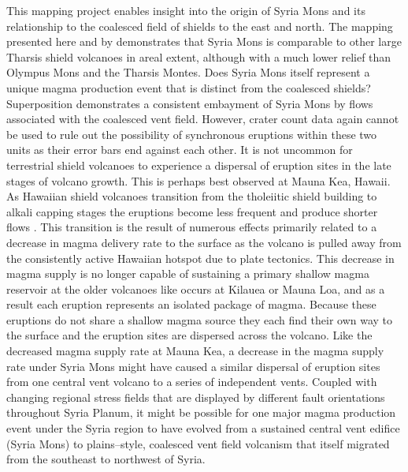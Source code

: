 \documentclass[preprint,review,authoryear,12pt]{elsarticle}
\begin{document}
This mapping project enables insight into the origin of Syria Mons and its relationship to the coalesced field of shields to the east and north.  The mapping presented here and by \citet{Baptista2008} demonstrates that Syria Mons is comparable to other large Tharsis shield volcanoes in areal extent, although with a much lower relief than Olympus Mons and the Tharsis Montes.  Does Syria Mons itself represent a unique magma production event that is distinct from the coalesced shields?  Superposition demonstrates a consistent embayment of Syria Mons by flows associated with the coalesced vent field.  However, crater count data again cannot be used to rule out the possibility of synchronous eruptions within these two units as their error bars end against each other. It is not uncommon for terrestrial shield volcanoes to experience a dispersal of eruption sites in the late stages of volcano growth.  This is perhaps best observed at Mauna Kea, Hawaii.  As Hawaiian shield volcanoes transition from the tholeiitic shield building to alkali capping stages the eruptions become less frequent and produce shorter flows \citep{Moore2007,Wolfe1996,Rowland2000,Bleacher2008}.  This transition is the result of numerous effects primarily related to a decrease in magma delivery rate to the surface as the volcano is pulled away from the consistently active Hawaiian hotspot due to plate tectonics.  This decrease in magma supply is no longer capable of sustaining a primary shallow magma reservoir at the older volcanoes like occurs at Kilauea or Mauna Loa, and as a result each eruption represents an isolated package of magma.  Because these eruptions do not share a shallow magma source they each find their own way to the surface and the eruption sites are dispersed across the volcano. Like the decreased magma supply rate at Mauna Kea, a decrease in the magma supply rate under Syria Mons might have caused a similar dispersal of eruption sites from one central vent volcano to a series of independent vents. Coupled with changing regional stress fields that are displayed by different fault orientations throughout Syria Planum, it might be possible for one major magma production event under the Syria region to have evolved from a sustained central vent edifice (Syria Mons) to plains--style, coalesced vent field volcanism that itself migrated from the southeast to northwest of Syria.  
\end{document}
